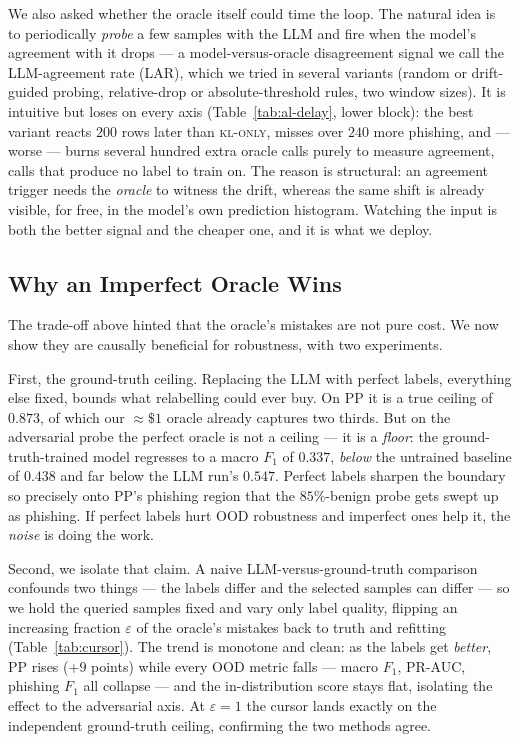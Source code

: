 We also asked whether the oracle itself could time the loop. The natural idea is
to periodically \emph{probe} a few samples with the LLM and fire when the model's
agreement with it drops --- a model-versus-oracle disagreement signal we call the
LLM-agreement rate (LAR), which we tried in several variants (random or
drift-guided probing, relative-drop or absolute-threshold rules, two window
sizes). It is intuitive but loses on every axis (Table~\ref{tab:al-delay}, lower
block): the best variant reacts $200$ rows later than \textsc{kl-only}, misses
over $240$ more phishing, and --- worse --- burns several hundred extra oracle
calls purely to measure agreement, calls that produce no label to train on. The
reason is structural: an agreement trigger needs the \emph{oracle} to witness the
drift, whereas the same shift is already visible, for free, in the model's own
prediction histogram. Watching the input is both the better signal and the
cheaper one, and it is what we deploy.

\subsection{Why an Imperfect Oracle Wins}
\label{sec:noise}

The trade-off above hinted that the oracle's mistakes are not pure cost. We now
show they are causally beneficial for robustness, with two experiments.

First, the ground-truth ceiling. Replacing the LLM with perfect labels,
everything else fixed, bounds what relabelling could ever buy. On PP it is a true
ceiling of $0.873$, of which our $\approx\!\$1$ oracle already captures two
thirds. But on the adversarial probe the perfect oracle is not a ceiling --- it
is a \emph{floor}: the ground-truth-trained model regresses to a macro $F_1$ of
$0.337$, \emph{below} the untrained baseline of $0.438$ and far below the LLM
run's $0.547$. Perfect labels sharpen the boundary so precisely onto PP's
phishing region that the $85\%$-benign probe gets swept up as phishing. If
perfect labels hurt OOD robustness and imperfect ones help it, the \emph{noise}
is doing the work.

Second, we isolate that claim. A naive LLM-versus-ground-truth comparison
confounds two things --- the labels differ and the selected samples can differ
--- so we hold the queried samples fixed and vary only label quality, flipping an
increasing fraction $\varepsilon$ of the oracle's mistakes back to truth and
refitting (Table~\ref{tab:cursor}). The trend is monotone and clean: as the
labels get \emph{better}, PP rises ($+9$ points) while every OOD metric falls
--- macro $F_1$, PR-AUC, phishing $F_1$ all collapse --- and the in-distribution
score stays flat, isolating the effect to the adversarial axis. At
$\varepsilon=1$ the cursor lands exactly on the independent ground-truth ceiling,
confirming the two methods agree.


